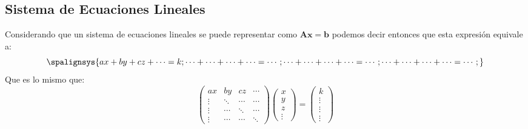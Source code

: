 \subsection{Sistema de Ecuaciones Lineales}
\noindent Considerando que un sistema de ecuaciones lineales se puede representar como \(\mathbf{Ax = b}\) podemos decir entonces que esta expresión equivale a:
\[
        \spalignsys{
                ax +  by + cz + \cdots = k ;
                \cdots + \cdots +  \cdots +  \cdots = \cdots ;
                \cdots + \cdots +  \cdots +  \cdots =  \cdots ;
                \cdots + \cdots +  \cdots +  \cdots = \cdots ;
        }
\]
\noindent Que es lo mismo que:
\[
        \begin{pmatrix}
                ax     & by     & cz     & \cdots \\
                \vdots & \ddots & \cdots & \cdots \\
                \vdots & \cdots & \ddots & \cdots \\
                \vdots & \cdots & \cdots & \ddots
        \end{pmatrix}
        \begin{pmatrix}
                x \\
                y \\
                z \\
                \vdots
        \end{pmatrix}
        =
        \begin{pmatrix}
                k      \\
                \vdots \\
                \vdots \\
                \vdots
        \end{pmatrix}
\]
